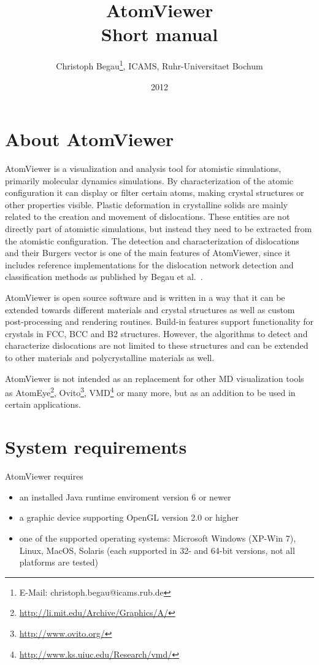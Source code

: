 \documentclass[a4paper,12pt]{scrartcl}
\title{AtomViewer\\Short manual}
\author{Christoph Begau\footnote{E-Mail: christoph.begau@icams.rub.de}, ICAMS, Ruhr-Universitaet Bochum}
\date{2012}
\begin{document}
\maketitle

\section{About AtomViewer}
AtomViewer is a visualization and analysis tool for atomistic simulations, primarily molecular dynamics simulations.
By characterization of the atomic configuration it can display or filter certain atoms, making crystal structures or other properties visible.
Plastic deformation in crystalline solids are mainly related to the creation and movement of dislocations. These entities are not directly part of atomistic simulations, but instead they need to be extracted from the atomistic configuration.
The detection and characterization of dislocations and their Burgers vector is one of the main features of AtomViewer, since it includes reference implementations for the dislocation network detection and classification methods as published by Begau et al.~\cite{Begau2011934,Begau2012}.

AtomViewer is open source software and is written in a way that it can be extended towards different materials and crystal structures as well as custom post-processing and rendering routines.
Build-in features support functionality for crystals in FCC, BCC and B2 structures. However, the algorithms to detect and characterize dislocations are not limited to these structures and can be extended to other materials and polycrystalline materials as well.

AtomViewer is not intended as an replacement for other MD visualization tools as AtomEye\footnote{\url{http://li.mit.edu/Archive/Graphics/A/}}, Ovito\footnote{\url{http://www.ovito.org/}}, VMD\footnote{\url{http://www.ks.uiuc.edu/Research/vmd/}} or many more, but as an addition to be used in certain applications.

\newpage
\section{System requirements}

AtomViewer requires 
\begin{itemize}
 \item{ an installed Java runtime enviroment version 6 or newer}
 \item{ a graphic device supporting OpenGL version 2.0 or higher}
 \item{ one of the supported operating systems: Microsoft Windows (XP-Win 7), Linux, MacOS, Solaris (each supported in 32- and 64-bit versions, not all platforms are tested) }
\end{itemize}
\end{document}
